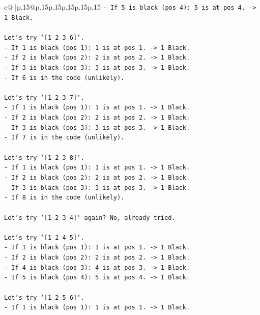\documentclass{article}
\begin{document}
{\begin{supertabular}{c@{$\;$}|p{.15\linewidth}@{}p{.15\linewidth}p{.15\linewidth}p{.15\linewidth}p{.15\linewidth}p{.15\linewidth}}
{{{\texttt{{-} If 5 is black (pos 4): 5 is at pos 4. {-}> 1 Black.} \\
\\ 
\texttt{Let's try `{[}1 2 3 6{]}`.} \\
\texttt{{-} If 1 is black (pos 1): 1 is at pos 1. {-}> 1 Black.} \\
\texttt{{-} If 2 is black (pos 2): 2 is at pos 2. {-}> 1 Black.} \\
\texttt{{-} If 3 is black (pos 3): 3 is at pos 3. {-}> 1 Black.} \\
\texttt{{-} If 6 is in the code (unlikely).} \\
\\ 
\texttt{Let's try `{[}1 2 3 7{]}`.} \\
\texttt{{-} If 1 is black (pos 1): 1 is at pos 1. {-}> 1 Black.} \\
\texttt{{-} If 2 is black (pos 2): 2 is at pos 2. {-}> 1 Black.} \\
\texttt{{-} If 3 is black (pos 3): 3 is at pos 3. {-}> 1 Black.} \\
\texttt{{-} If 7 is in the code (unlikely).} \\
\\ 
\texttt{Let's try `{[}1 2 3 8{]}`.} \\
\texttt{{-} If 1 is black (pos 1): 1 is at pos 1. {-}> 1 Black.} \\
\texttt{{-} If 2 is black (pos 2): 2 is at pos 2. {-}> 1 Black.} \\
\texttt{{-} If 3 is black (pos 3): 3 is at pos 3. {-}> 1 Black.} \\
\texttt{{-} If 8 is in the code (unlikely).} \\
\\ 
\texttt{Let's try `{[}1 2 3 4{]}` again? No, already tried.} \\
\\ 
\texttt{Let's try `{[}1 2 4 5{]}`.} \\
\texttt{{-} If 1 is black (pos 1): 1 is at pos 1. {-}> 1 Black.} \\
\texttt{{-} If 2 is black (pos 2): 2 is at pos 2. {-}> 1 Black.} \\
\texttt{{-} If 4 is black (pos 3): 4 is at pos 3. {-}> 1 Black.} \\
\texttt{{-} If 5 is black (pos 4): 5 is at pos 4. {-}> 1 Black.} \\
\\ 
\texttt{Let's try `{[}1 2 5 6{]}`.} \\
\texttt{{-} If 1 is black (pos 1): 1 is at pos 1. {-}> 1 Black.} \\
}}}
\end{supertabular}}
\end{document}
